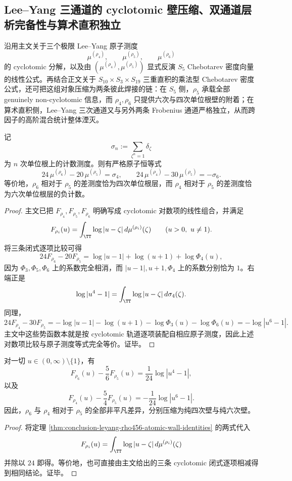 \subsection{Lee--Yang 三通道的 cyclotomic 壁压缩、双通道层析完备性与算术直积独立}\label{subsec:conclusion-leyang-rho456-cyclotomic-wall-compression}
沿用主文关于三个极限 Lee--Yang 原子测度
\[
\mu^{(\rho_4)},\qquad \mu^{(\rho_5)},\qquad \mu^{(\rho_6)}
\]
的 cyclotomic 分解，以及由 \((\mu^{(\rho_4)},\mu^{(\rho_5)})\) 显式反演 \(S_5\) Chebotarev 密度向量的线性公式。再结合正文关于 \(S_{10}\times S_3\times S_{19}\) 三重直积的乘法型 Chebotarev 密度公式，还可把这组对象压缩为两条彼此焊接的链：在 \(S_5\) 侧，\(\rho_5\) 承载全部 genuinely non-cyclotomic 信息，而 \(\rho_4,\rho_6\) 只提供六次与四次单位根壁的附着；在算术直积侧，Lee--Yang 三次通道又与另外两条 Frobenius 通道严格独立，从而跨因子的高阶混合统计整体湮灭。

\begin{theorem}\label{thm:conclusion-leyang-rho456-atomic-wall-identities}
记
\[
\sigma_n:=\sum_{\zeta^n=1}\delta_\zeta
\]
为 \(n\) 次单位根上的计数测度。则有严格原子恒等式
\[
24\,\mu^{(\rho_6)}-20\,\mu^{(\rho_5)}=\sigma_4,
\qquad
24\,\mu^{(\rho_4)}-30\,\mu^{(\rho_5)}=-\sigma_6.
\]
等价地，\(\rho_6\) 相对于 \(\rho_5\) 的差测度恰为四次单位根层，而 \(\rho_4\) 相对于 \(\rho_5\) 的差测度恰为六次单位根层的负计数。
\end{theorem}
\begin{proof}
主文已把 \(F_{\rho_4},F_{\rho_5},F_{\rho_6}\) 明确写成 cyclotomic 对数项的线性组合，并满足
\[
F_{\rho_i}(u)=\int_{\TT}\log|u-\zeta|\,d\mu^{(\rho_i)}(\zeta)
\qquad (u>0,\ u\neq 1).
\]
将三条闭式逐项比较可得
\[
24F_{\rho_6}-20F_{\rho_5}
=
\log|u-1|+\log(u+1)+\log\Phi_4(u),
\]
因为 \(\Phi_3,\Phi_5,\Phi_6\) 上的系数完全相消，而 \(|u-1|,u+1,\Phi_4\) 上的系数分别恰为 \(1\)。右端正是
\[
\log|u^4-1|
=
\int_{\TT}\log|u-\zeta|\,d\sigma_4(\zeta).
\]
同理，
\[
24F_{\rho_4}-30F_{\rho_5}
=
-\log|u-1|-\log(u+1)-\log\Phi_3(u)-\log\Phi_6(u)
=
-\log|u^6-1|.
\]
主文中这些势函数本就是按 cyclotomic 轨道逐项装配自相应原子测度，因此上述对数项比较与原子测度等式完全等价。证毕。
\end{proof}

\begin{theorem}\label{thm:conclusion-leyang-rho456-wall-potential-identities}
对一切 \(u\in (0,\infty)\setminus\{1\}\)，有
\[
F_{\rho_6}(u)-\frac56F_{\rho_5}(u)=\frac1{24}\log|u^4-1|,
\]
以及
\[
F_{\rho_4}(u)-\frac54F_{\rho_5}(u)=-\frac1{24}\log|u^6-1|.
\]
因此，\(\rho_6\) 与 \(\rho_4\) 相对于 \(\rho_5\) 的全部非平凡差异，分别压缩为纯四次壁与纯六次壁。
\end{theorem}
\begin{proof}
将定理 \ref{thm:conclusion-leyang-rho456-atomic-wall-identities} 的两式代入
\[
F_{\rho_i}(u)=\int_{\TT}\log|u-\zeta|\,d\mu^{(\rho_i)}(\zeta)
\]
并除以 \(24\) 即得。等价地，也可直接由主文给出的三条 cyclotomic 闭式逐项相减得到相同结论。证毕。
\end{proof}

